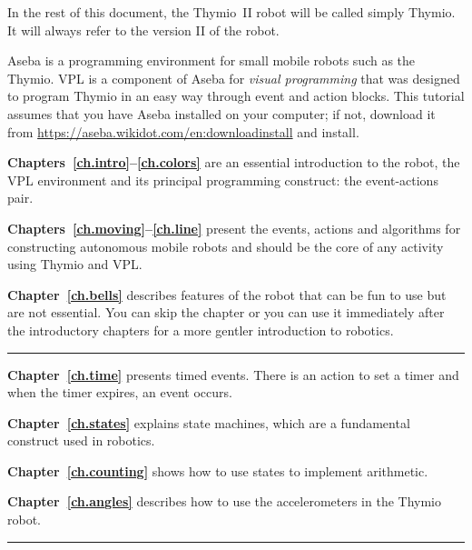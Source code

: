 In the rest of this document, the Thymio~II robot will be called simply
Thymio. It will always refer to the version II of the robot.

Aseba is a programming environment for small mobile robots such as the
Thymio. VPL is a component of Aseba for \textit{visual programming} that
was designed to program Thymio in an easy way through event and action
blocks. This tutorial assumes that you have Aseba installed on your
computer; if not, download it from 
\url{https://aseba.wikidot.com/en:downloadinstall} and install.

\newpage


\textbf{Chapters~\ref{ch.intro}--\ref{ch.colors}} are an essential
introduction to the robot, the VPL environment and its principal
programming construct: the event-actions pair.

\textbf{Chapters~\ref{ch.moving}--\ref{ch.line}} present the events,
actions and algorithms for constructing autonomous mobile robots and
should be the core of any activity using Thymio and VPL.

\textbf{Chapter~\ref{ch.bells}} describes features of the robot that can
be fun to use but are not essential. You can skip the chapter or you can
use it immediately after the introductory chapters for a more gentler
introduction to robotics.

\bigskip

\hrule

\bigskip


\textbf{Chapter~\ref{ch.time}} presents timed events. There is an action
to set a timer and when the timer expires, an event occurs.

\textbf{Chapter~\ref{ch.states}} explains state machines, which are a
fundamental construct used in robotics.

\textbf{Chapter~\ref{ch.counting}} shows how to use states to implement
arithmetic.

\textbf{Chapter~\ref{ch.angles}} describes how to use the accelerometers
in the Thymio robot.

\bigskip

\hrule

